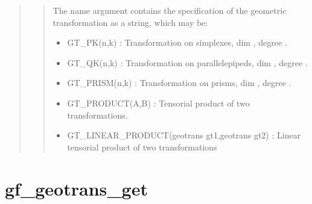 \documentclass[a4paper,11pt,english]{sphinxmanual}
\begin{document}
\begin{quote}

\begin{quote}

The name argument contains the specification of the geometric transformation
as a string, which may be:
\begin{itemize}
\item {} 
GT\_PK(n,k) :
Transformation on simplexes, dim , degree .

\item {} 
GT\_QK(n,k) :
Transformation on parallelepipeds, dim , degree .

\item {} 
GT\_PRISM(n,k) :
Transformation on prisms, dim , degree .

\item {} 
GT\_PRODUCT(A,B) :
Tensorial product of two transformations.

\item {} 
GT\_LINEAR\_PRODUCT(geotrans gt1,geotrans gt2) :
Linear tensorial product of two transformations

\end{itemize}
\end{quote}
\end{quote}


\section{gf\_geotrans\_get}
\label{\detokenize{matlab_octave/cmdref_gf_geotrans_get:gf-geotrans-get}}\label{\detokenize{matlab_octave/cmdref_gf_geotrans_get::doc}}
\end{document}
